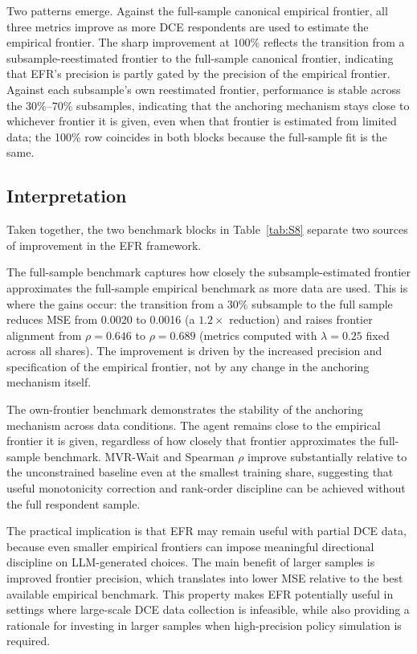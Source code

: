 \documentclass[11pt]{article}
\begin{document}
Two patterns emerge. Against the full-sample canonical empirical frontier, all three metrics improve as more DCE respondents are used to estimate the empirical frontier. The sharp improvement at $100\%$ reflects the transition from a subsample-reestimated frontier to the full-sample canonical frontier, indicating that EFR's precision is partly gated by the precision of the empirical frontier. Against each subsample's own reestimated frontier, performance is stable across the $30\%$--$70\%$ subsamples, indicating that the anchoring mechanism stays close to whichever frontier it is given, even when that frontier is estimated from limited data; the 100\% row coincides in both blocks because the full-sample fit is the same.

\subsection{Interpretation}
\label{app:interpretation}

Taken together, the two benchmark blocks in Table~\ref{tab:S8} separate two sources of improvement in the EFR framework.

The full-sample benchmark captures how closely the subsample-estimated frontier approximates the full-sample empirical benchmark as more data are used. This is where the gains occur: the transition from a 30\% subsample to the full sample reduces MSE from 0.0020 to 0.0016 (a $1.2\times$ reduction) and raises frontier alignment from $\rho = 0.646$ to $\rho = 0.689$ (metrics computed with $\lambda = 0.25$ fixed across all shares). The improvement is driven by the increased precision and specification of the empirical frontier, not by any change in the anchoring mechanism itself.

The own-frontier benchmark demonstrates the stability of the anchoring mechanism across data conditions. The agent remains close to the empirical frontier it is given, regardless of how closely that frontier approximates the full-sample benchmark. MVR-Wait and Spearman \(\rho\) improve substantially relative to the unconstrained baseline even at the smallest training share, suggesting that useful monotonicity correction and rank-order discipline can be achieved without the full respondent sample.

The practical implication is that EFR may remain useful with partial DCE data, because even smaller empirical frontiers can impose meaningful directional discipline on LLM-generated choices. The main benefit of larger samples is improved frontier precision, which translates into lower MSE relative to the best available empirical benchmark. This property makes EFR potentially useful in settings where large-scale DCE data collection is infeasible, while also providing a rationale for investing in larger samples when high-precision policy simulation is required.
\end{document}

